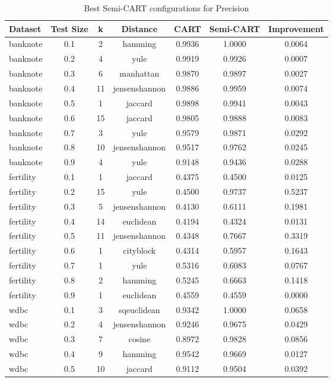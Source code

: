 \begin{table}[ht]
\centering
\caption{Best Semi-CART configurations for Precision}
\begin{tabular}{lcccccc}
\hline
Dataset & Test Size & k & Distance & CART & Semi-CART & Improvement \\ \hline
banknote & 0.1 & 2 & hamming & 0.9936 & 1.0000 & 0.0064 \\
banknote & 0.2 & 4 & yule & 0.9919 & 0.9926 & 0.0007 \\
banknote & 0.3 & 6 & manhattan & 0.9870 & 0.9897 & 0.0027 \\
banknote & 0.4 & 11 & jensenshannon & 0.9886 & 0.9959 & 0.0074 \\
banknote & 0.5 & 1 & jaccard & 0.9898 & 0.9941 & 0.0043 \\
banknote & 0.6 & 15 & jaccard & 0.9805 & 0.9888 & 0.0083 \\
banknote & 0.7 & 3 & yule & 0.9579 & 0.9871 & 0.0292 \\
banknote & 0.8 & 10 & jensenshannon & 0.9517 & 0.9762 & 0.0245 \\
banknote & 0.9 & 4 & yule & 0.9148 & 0.9436 & 0.0288 \\
fertility & 0.1 & 1 & jaccard & 0.4375 & 0.4500 & 0.0125 \\
fertility & 0.2 & 15 & yule & 0.4500 & 0.9737 & 0.5237 \\
fertility & 0.3 & 5 & jensenshannon & 0.4130 & 0.6111 & 0.1981 \\
fertility & 0.4 & 14 & euclidean & 0.4194 & 0.4324 & 0.0131 \\
fertility & 0.5 & 11 & jensenshannon & 0.4348 & 0.7667 & 0.3319 \\
fertility & 0.6 & 1 & cityblock & 0.4314 & 0.5957 & 0.1643 \\
fertility & 0.7 & 1 & yule & 0.5316 & 0.6083 & 0.0767 \\
fertility & 0.8 & 2 & hamming & 0.5245 & 0.6663 & 0.1418 \\
fertility & 0.9 & 1 & euclidean & 0.4559 & 0.4559 & 0.0000 \\
wdbc & 0.1 & 3 & sqeuclidean & 0.9342 & 1.0000 & 0.0658 \\
wdbc & 0.2 & 4 & jensenshannon & 0.9246 & 0.9675 & 0.0429 \\
wdbc & 0.3 & 7 & cosine & 0.8972 & 0.9828 & 0.0856 \\
wdbc & 0.4 & 9 & hamming & 0.9542 & 0.9669 & 0.0127 \\
wdbc & 0.5 & 10 & jaccard & 0.9112 & 0.9504 & 0.0392 \\

\end{tabular}
\end{table}

